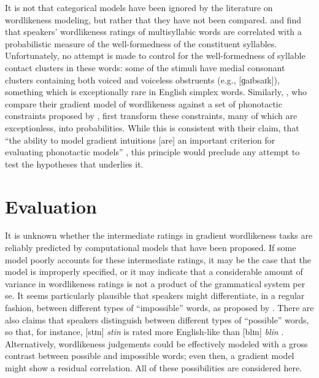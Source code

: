 It is not that categorical models have been ignored by the literature on wordlikeness modeling, but rather that they have not been compared. 
\citet{Frisch2000} and \citet{Vitevitch1997} find that speakers' wordlikeness ratings of multisyllabic words are correlated with a probabilistic measure of the well-formedness of the constituent syllables. 
Unfortunately, no attempt is made to control for the well-formedness of syllable contact clusters in these words: some of the stimuli have medial consonant clusters containing both voiced and voiceless obstruents (e.g., [ɡaɪbsaɪk]), something which is exceptionally rare in English simplex words.
Similarly, \citet{Hayes2008a}, who compare their gradient model of wordlikeness against a set of phonotactic constraints proposed by \citet{Clements1983}, first transform these constraints, many of which are exceptionless, into probabilities. 
While this is consistent with their claim, that ``the ability to model gradient intuitions [are] an important criterion for evaluating phonotactic models'' \citep[382]{Hayes2008a}, this principle would preclude any attempt to test the hypotheses that underlies it.


\section{Evaluation}
\label{2evaluation}

It is unknown whether the intermediate ratings in gradient wordlikeness tasks are reliably predicted by computational models that have been proposed. 
If some model poorly accounts for these intermediate ratings, it may be the case that the model is improperly specified, or it may indicate that a considerable amount of variance in wordlikeness ratings is not a product of the grammatical system per se. 
It seems particularly plausible that speakers might differentiate, in a regular fashion, between different types of ``impossible'' words, as proposed by \citet{SPE}. 
There are also claims that speakers distinguish between different types of ``possible'' words, so that, for instance, [stɪn] \emph{stin} is rated more English-like than [blɪn] \emph{blin} \citep{Albright2009a}. 
Alternatively, wordlikeness judgements could be effectively modeled with a gross contrast between possible and impossible words; even then, a gradient model might show a residual correlation.
All of these possibilities are considered here.



